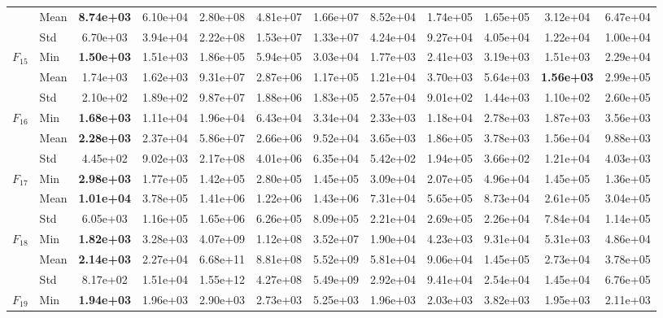 \begin{center}
\begin{longtable}{clcccccccccc}
 & Mean & \textbf{8.74e+03} & 6.10e+04 & 2.80e+08 & 4.81e+07 & 1.66e+07 & 8.52e+04 & 1.74e+05 & 1.65e+05 & 3.12e+04 & 6.47e+04 \\
 & Std & 6.70e+03 & 3.94e+04 & 2.22e+08 & 1.53e+07 & 1.33e+07 & 4.24e+04 & 9.27e+04 & 4.05e+04 & 1.22e+04 & 1.00e+04 \\
\midrule
\multirow{3}{*}{$F_{15}$} & Min & \textbf{1.50e+03} & 1.51e+03 & 1.86e+05 & 5.94e+05 & 3.03e+04 & 1.77e+03 & 2.41e+03 & 3.19e+03 & 1.51e+03 & 2.29e+04 \\
 & Mean & 1.74e+03 & 1.62e+03 & 9.31e+07 & 2.87e+06 & 1.17e+05 & 1.21e+04 & 3.70e+03 & 5.64e+03 & \textbf{1.56e+03} & 2.99e+05 \\
 & Std & 2.10e+02 & 1.89e+02 & 9.87e+07 & 1.88e+06 & 1.83e+05 & 2.57e+04 & 9.01e+02 & 1.44e+03 & 1.10e+02 & 2.60e+05 \\
\midrule
\multirow{3}{*}{$F_{16}$} & Min & \textbf{1.68e+03} & 1.11e+04 & 1.96e+04 & 6.43e+04 & 3.34e+04 & 2.33e+03 & 1.18e+04 & 2.78e+03 & 1.87e+03 & 3.56e+03 \\
 & Mean & \textbf{2.28e+03} & 2.37e+04 & 5.86e+07 & 2.66e+06 & 9.52e+04 & 3.65e+03 & 1.86e+05 & 3.78e+03 & 1.56e+04 & 9.88e+03 \\
 & Std & 4.45e+02 & 9.02e+03 & 2.17e+08 & 4.01e+06 & 6.35e+04 & 5.42e+02 & 1.94e+05 & 3.66e+02 & 1.21e+04 & 4.03e+03 \\
\midrule
\multirow{3}{*}{$F_{17}$} & Min & \textbf{2.98e+03} & 1.77e+05 & 1.42e+05 & 2.80e+05 & 1.45e+05 & 3.09e+04 & 2.07e+05 & 4.96e+04 & 1.45e+05 & 1.36e+05 \\
 & Mean & \textbf{1.01e+04} & 3.78e+05 & 1.41e+06 & 1.22e+06 & 1.43e+06 & 7.31e+04 & 5.65e+05 & 8.73e+04 & 2.61e+05 & 3.04e+05 \\
 & Std & 6.05e+03 & 1.16e+05 & 1.65e+06 & 6.26e+05 & 8.09e+05 & 2.21e+04 & 2.69e+05 & 2.26e+04 & 7.84e+04 & 1.14e+05 \\
\midrule
\multirow{3}{*}{$F_{18}$} & Min & \textbf{1.82e+03} & 3.28e+03 & 4.07e+09 & 1.12e+08 & 3.52e+07 & 1.90e+04 & 4.23e+03 & 9.31e+04 & 5.31e+03 & 4.86e+04 \\
 & Mean & \textbf{2.14e+03} & 2.27e+04 & 6.68e+11 & 8.81e+08 & 5.52e+09 & 5.81e+04 & 9.06e+04 & 1.45e+05 & 2.73e+04 & 3.78e+05 \\
 & Std & 8.17e+02 & 1.51e+04 & 1.55e+12 & 4.27e+08 & 5.49e+09 & 2.92e+04 & 9.41e+04 & 2.54e+04 & 1.45e+04 & 6.76e+05 \\
\midrule
\multirow{3}{*}{$F_{19}$} & Min & \textbf{1.94e+03} & 1.96e+03 & 2.90e+03 & 2.73e+03 & 5.25e+03 & 1.96e+03 & 2.03e+03 & 3.82e+03 & 1.95e+03 & 2.11e+03 \\

\end{longtable}
\end{center}
